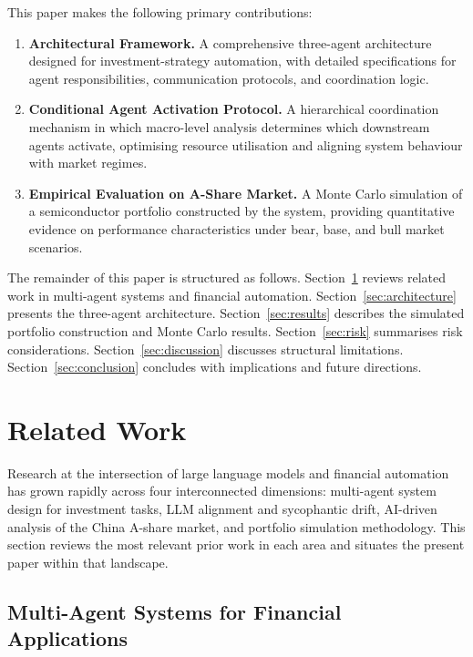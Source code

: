 \documentclass[11pt,a4paper]{article}
\begin{document}
This paper makes the following primary contributions:

\begin{enumerate}
  \item \textbf{Architectural Framework.} A comprehensive three-agent
        architecture designed for investment-strategy automation, with
        detailed specifications for agent responsibilities,
        communication protocols, and coordination logic.
  \item \textbf{Conditional Agent Activation Protocol.} A hierarchical
        coordination mechanism in which macro-level analysis determines
        which downstream agents activate, optimising resource utilisation
        and aligning system behaviour with market regimes.
  \item \textbf{Empirical Evaluation on A-Share Market.} A Monte Carlo
        simulation of a semiconductor portfolio constructed by the
        system, providing quantitative evidence on performance
        characteristics under bear, base, and bull market scenarios.
\end{enumerate}

The remainder of this paper is structured as follows.
Section~\ref{sec:related} reviews related work in multi-agent systems
and financial automation.
Section~\ref{sec:architecture} presents the three-agent architecture.
Section~\ref{sec:results} describes the simulated portfolio construction
and Monte Carlo results.
Section~\ref{sec:risk} summarises risk considerations.
Section~\ref{sec:discussion} discusses structural limitations.
Section~\ref{sec:conclusion} concludes with implications and future
directions.

\section{Related Work}
\label{sec:related}

Research at the intersection of large language models and financial
automation has grown rapidly across four interconnected dimensions:
multi-agent system design for investment tasks, LLM alignment and
sycophantic drift, AI-driven analysis of the China A-share market, and
portfolio simulation methodology. This section reviews the most relevant
prior work in each area and situates the present paper within that
landscape.

\subsection{Multi-Agent Systems for Financial Applications}
\end{document}
